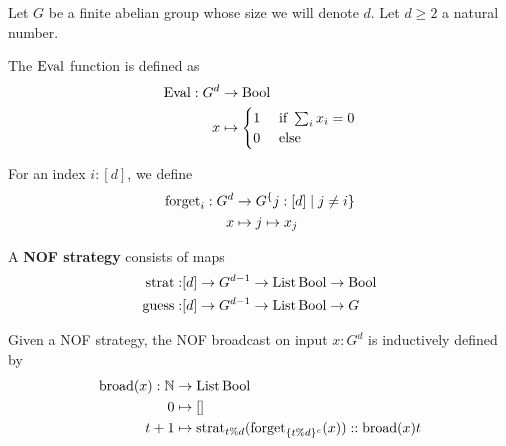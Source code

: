 
Let $G$ be a finite abelian group whose size we will denote $d$. Let $d \ge 2$ a natural number.

\begin{definition}
  \label{def:eval}
  \uses{}

  The $\operatorname{Eval}$ function is defined as
  \begin{align}
      \operatorname{Eval} : G^d & \to \operatorname{Bool} \\
      x & \mapsto \begin{cases}
      1 & \text{ if } \sum_i x_i = 0 \\
      0 & \text{ else}
    \end{cases}
  \end{align}
\end{definition}

\begin{definition}
  \label{def:forget}

  For an index $i : [d]$, we define
  \begin{align}
    \operatorname{forget}_i : G^d & \to G^\{j : [d] \mid j \ne i\} \\
    x & \mapsto j \mapsto x_j
  \end{align}
\end{definition}

\begin{definition}
  \label{def:strategy}
  \uses{}

  A {\bf NOF strategy} consists of maps
  \begin{align}
    \operatorname{strat} : & [d] \to G^{d - 1} \to \operatorname{List} \operatorname{Bool} \to \operatorname{Bool} \\
    \operatorname{guess} : & [d] \to G^{d - 1} \to \operatorname{List} \operatorname{Bool} \to G
  \end{align}
\end{definition}

\begin{definition}
  \label{def:broadcast}

  Given a NOF strategy, the NOF broadcast on input $x : G^d$ is inductively defined by
  \begin{align}
    \operatorname{broad}(x) : \mathbb{N} & \to \operatorname{List} \operatorname{Bool} \\
    0 & \mapsto [] \\
    t + 1 & \mapsto \operatorname{strat}_{t \% d}(\operatorname{forget}_{\{t \% d\}^c}(x)) :: \operatorname{broad}(x) t
  \end{align}
\end{definition}

